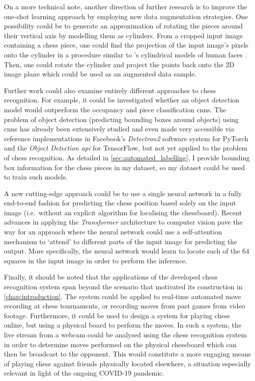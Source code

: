 \documentclass[../report.tex]{subfiles}
\begin{document}
On a more technical note, another direction of further research is to improve the one-shot learning approach by employing new data augmentation strategies.
One possibility could be to generate an approximation of rotating the pieces around their vertical axis by modelling them as cylinders.
From a cropped input image containing a chess piece, one could find the projection of the input image's pixels onto the cylinder in a procedure similar to \citeauthor{sung2008}'s cylindrical models of human faces \cite{sung2008}.
Then, one could rotate the cylinder and project the points back onto the 2D image plane which could be used as an augmented data sample.

Further work could also examine entirely different approaches to chess recognition. 
For example, it could be investigated whether an object detection model would outperform the occupancy and piece classification \glspl{cnn}.
The problem of object detection (predicting bounding boxes around objects) using \glspl{cnn} has already been extensively studied and even made very accessible via reference implementations in Facebook's \emph{Detectron2} \cite{wu2019detectron2} software system for PyTorch and the \emph{Object Detection \acs{api}} \cite{tfodapi2020} for TensorFlow, but not yet applied to the problem of chess recognition.
As detailed in \cref{sec:automated_labelling}, I provide bounding box information for the chess pieces in my dataset, so my dataset could be used to train such models.

A new cutting-edge approach could be to use a single neural network in a fully end-to-end fashion for predicting the chess position based solely on the input image (i.e.\ without an explicit algorithm for localising the chessboard).
Recent advances in applying the \emph{Transformer} architecture \cite{vaswani2017} to computer vision \cite{wu2020,anonymous2020} pave the way for an approach where the neural network could use a self-attention mechanism to `attend' to different parts of the input image for predicting the output.
More specifically, the neural network would learn to locate each of the 64 squares in the input image in order to perform the inference.

Finally, it should be noted that the applications of the developed chess recognition system span beyond the scenario that motivated its construction in \cref{chap:introduction}.
The system could be applied to real-time automated move recording at chess tournaments, or recording moves from past games from video footage.
Furthermore, it could be used to design a system for playing chess online, but using a physical board to perform the moves.
In such a system, the live stream from a webcam could be analysed using the chess recognition system in order to determine moves performed on the physical chessboard which can then be broadcast to the opponent.
This would constitute a more engaging means of playing chess against friends physically located elsewhere, a situation especially relevant in light of the ongoing COVID-19 pandemic.

\ifSubfilesClassLoaded{%
\printglossary[type=\acronymtype]%
\printbibliography%
}{}%
\end{document}
